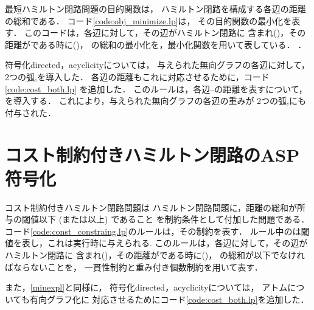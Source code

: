 最短ハミルトン閉路問題の目的関数は，
ハミルトン閉路を構成する各辺の距離の総和である．
コード\ref{code:obj_minimize.lp}は，
その目的関数の最小化を表す．
このコードは，各辺に対して，その辺がハミルトン閉路に
含まれ()，その距離がである時に()，
の総和の最小化を，最小化関数を用いて表している．
．


符号化directed，acyclicityについては，
与えられた無向グラフの各辺に対して，
2つの弧,を導入した．
各辺の距離もこれに対応させるために，コード\ref{code:cost_both.lp}
を追加した．
このルールは，各辺--の距離を表すについて，
を導入する．
これにより，与えられた無向グラフの各辺の重みが
2つの弧,にも付与された．

\section{コスト制約付きハミルトン閉路のASP符号化}



コスト制約付きハミルトン閉路問題は
ハミルトン閉路問題に，距離の総和が所与の閾値以下 (または以上) であること
を制約条件として付加した問題である．
コード\ref{code:const_constraing.lp}のルールは，その制約を表す．
ルール中のは閾値を表し，これは実行時に与えられる.
このルールは，各辺に対して，その辺がハミルトン閉路に
含まれ()，その距離がである時に()，
の総和が以下でなければならないことを，
一貫性制約と重み付き個数制約を用いて表す．

また，\ref{minexpl}と同様に，
符号化directed，acyclicityについては，
アトムについても有向グラフ化に
対応させるためにコード\ref{code:cost_both.lp}を追加した．


